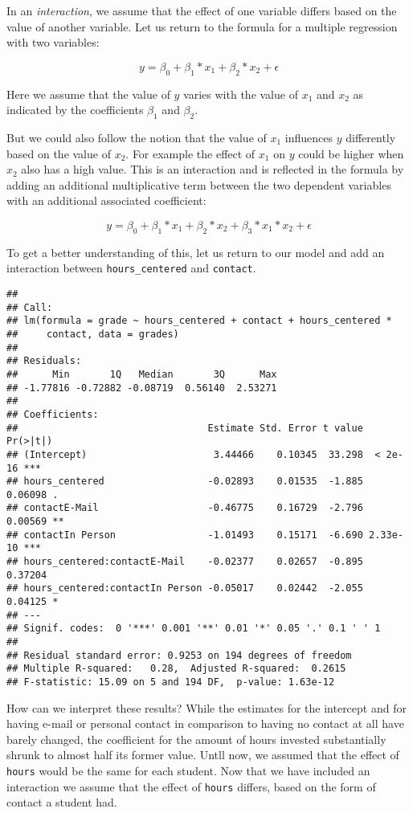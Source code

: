 \documentclass[
]{book}
\begin{document}
In an \emph{interaction}, we assume that the effect of one variable differs based on
the value of another variable. Let us return to the formula for a multiple
regression with two variables:

\[y = \beta_0 + \beta_1*x_1 + \beta_2*x_2 + \epsilon\]

Here we assume that the value of \(y\) varies with the value of \(x_1\) and \(x_2\) as
indicated by the coefficients \(\beta_1\) and \(\beta_2\).

But we could also follow the notion that the value of \(x_1\) influences \(y\)
differently based on the value of \(x_2\). For example the effect of \(x_1\) on \(y\)
could be higher when \(x_2\) also has a high value. This is an interaction and is
reflected in the formula by adding an additional multiplicative term between
the two dependent variables with an additional associated coefficient:

\[y = \beta_0 + \beta_1*x_1 + \beta_2*x_2 + \beta_3 * x_1 * x_2 + \epsilon\]

To get a better understanding of this, let us return to our model and add an
interaction between \texttt{hours\_centered} and \texttt{contact}.

\begin{verbatim}
## 
## Call:
## lm(formula = grade ~ hours_centered + contact + hours_centered * 
##     contact, data = grades)
## 
## Residuals:
##      Min       1Q   Median       3Q      Max 
## -1.77816 -0.72882 -0.08719  0.56140  2.53271 
## 
## Coefficients:
##                                 Estimate Std. Error t value Pr(>|t|)    
## (Intercept)                      3.44466    0.10345  33.298  < 2e-16 ***
## hours_centered                  -0.02893    0.01535  -1.885  0.06098 .  
## contactE-Mail                   -0.46775    0.16729  -2.796  0.00569 ** 
## contactIn Person                -1.01493    0.15171  -6.690 2.33e-10 ***
## hours_centered:contactE-Mail    -0.02377    0.02657  -0.895  0.37204    
## hours_centered:contactIn Person -0.05017    0.02442  -2.055  0.04125 *  
## ---
## Signif. codes:  0 '***' 0.001 '**' 0.01 '*' 0.05 '.' 0.1 ' ' 1
## 
## Residual standard error: 0.9253 on 194 degrees of freedom
## Multiple R-squared:   0.28,  Adjusted R-squared:  0.2615 
## F-statistic: 15.09 on 5 and 194 DF,  p-value: 1.63e-12
\end{verbatim}

How can we interpret these results?
While the estimates for the intercept and for having e-mail or personal contact
in comparison to having no contact at all have barely changed, the coefficient
for the amount of hours invested substantially shrunk to almost half its former
value. Untll now, we assumed that the effect of \texttt{hours} would be the same for
each student. Now that we have included an interaction we assume that the effect
of \texttt{hours} differs, based on the form of contact a student had.
\end{document}
